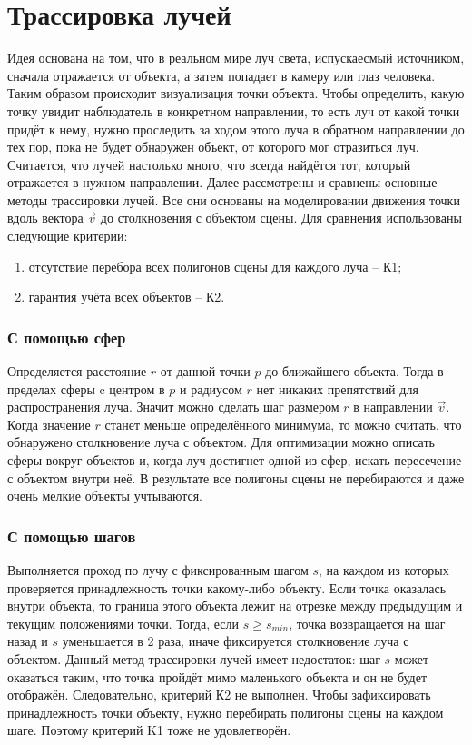 \section{Трассировка лучей} {
    Идея основана на том, что в реальном мире луч света, испускаесмый источником,
    сначала отражается от объекта, а затем попадает в камеру или глаз человека.
    Таким образом происходит визуализация точки объекта.
    Чтобы определить, какую точку увидит наблюдатель в конкретном направлении, то есть луч от какой точки придёт к нему, нужно проследить за ходом этого луча
    в обратном направлении до тех пор, пока не будет обнаружен объект,
    от которого мог отразиться луч.
    Считается, что лучей настолько много, что всегда найдётся тот,
    который отражается в нужном направлении.
    Далее рассмотрены и сравнены основные методы трассировки лучей.
    Все они основаны на моделировании движения точки вдоль вектора $\vec{v}$ до
    столкновения с объектом сцены.
    Для сравнения использованы следующие критерии:
    \begin{enumerate}
        \item отсутствие перебора всех полигонов сцены для каждого луча -- К1;
        \item гарантия учёта всех объектов -- К2.
    \end{enumerate}

    \subsubsection{С помощью сфер} {
        Определяется расстояние $r$ от данной точки $p$ до ближайшего объекта.
        Тогда в пределах сферы c центром в $p$ и радиусом $r$ нет никаких
        препятствий для распространения луча.
        Значит можно сделать шаг размером $r$ в направлении $\vec{v}$.
        Когда значение $r$ станет меньше определённого минимума, то можно считать,
        что обнаружено столкновение луча с объектом.
        Для оптимизации можно описать сферы вокруг объектов и, когда луч достигнет
        одной из сфер, искать пересечение с объектом внутри неё.
        В результате все полигоны сцены не перебираются и даже очень мелкие объекты
        учтываются.
    }

    \subsubsection{С помощью шагов} {
        Выполняется проход по лучу с фиксированным шагом $s$,
        на каждом из которых
        проверяется принадлежность точки какому-либо объекту.
        Если точка оказалась внутри объекта, то граница этого объекта лежит на
        отрезке между предыдущим и текущим положениями точки.
        Тогда, если $s \geq s_{min}$, точка возвращается на шаг назад и $s$
        уменьшается в 2 раза, иначе фиксируется столкновение луча с объектом.
        Данный метод трассировки лучей имеет недостаток:
        шаг $s$ может оказаться
        таким, что точка пройдёт мимо маленького объекта и он не будет отображён.
        Следовательно, критерий К2 не выполнен.
        Чтобы зафиксировать принадлежность точки объекту, нужно перебирать
        полигоны сцены на каждом шаге.
        Поэтому критерий K1 тоже не удовлетворён.
    }
    
}
